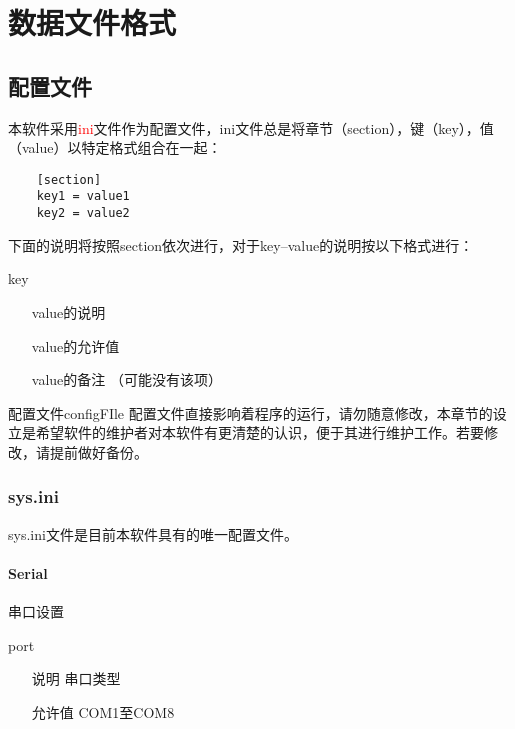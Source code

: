\chapter{数据文件格式}

\section{配置文件}
\par 本软件采用\textcolor{red}{ini}文件作为配置文件，ini文件总是将章节（section），键（key），值（value）以特定格式组合在一起：
\begin{lstlisting}
    [section]
    key1 = value1
    key2 = value2
\end{lstlisting}
\par 下面的说明将按照section依次进行，对于key--value的说明按以下格式进行：
\begin{definition}{key}{}
    \begin{itemize}
        \item[value的说明] 
        \item[value的允许值] 
        \item[value的备注] （可能没有该项） 
    \end{itemize}
\end{definition}

\begin{tips}{配置文件}{configFIle}
    配置文件直接影响着程序的运行，请勿随意修改，本章节的设立是希望软件的维护者对本软件有更清楚的认识，便于其进行维护工作。若要修改，请提前做好备份。
\end{tips}
\subsection{sys.ini}

sys.ini文件是目前本软件具有的唯一配置文件。
\subsubsection*{Serial}
串口设置
\begin{definition}{port}{}
    \begin{itemize}
        \item[说明] 串口类型
        \item[允许值] COM1至COM8
    \end{itemize}
\end{definition}

